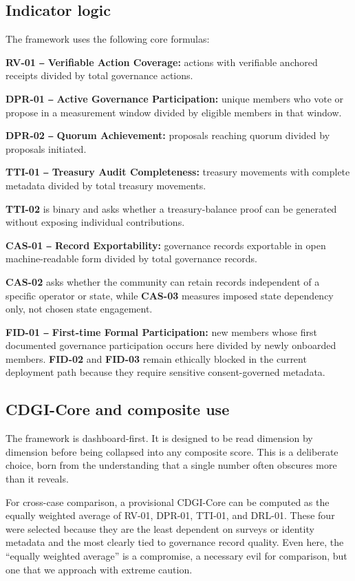 \documentclass[sigconf]{acmart}
\begin{document}
\subsection{Indicator logic}

The framework uses the following core formulas:

\textbf{RV-01 ‒ Verifiable Action Coverage:} actions with verifiable anchored receipts divided by total governance actions.

\textbf{DPR-01 ‒ Active Governance Participation:} unique members who vote or propose in a measurement window divided by eligible members in that window.

\textbf{DPR-02 ‒ Quorum Achievement:} proposals reaching quorum divided by proposals initiated.

\textbf{TTI-01 ‒ Treasury Audit Completeness:} treasury movements with complete metadata divided by total treasury movements.

\textbf{TTI-02} is binary and asks whether a treasury-balance proof can be generated without exposing individual contributions.

\textbf{CAS-01 ‒ Record Exportability:} governance records exportable in open machine-readable form divided by total governance records.

\textbf{CAS-02} asks whether the community can retain records independent of a specific operator or state, while \textbf{CAS-03} measures imposed state dependency only, not chosen state engagement.

\textbf{FID-01 ‒ First-time Formal Participation:} new members whose first documented governance participation occurs here divided by newly onboarded members. \textbf{FID-02} and \textbf{FID-03} remain ethically blocked in the current deployment path because they require sensitive consent-governed metadata.

\subsection{CDGI-Core and composite use}

The framework is dashboard-first. It is designed to be read dimension by dimension before being collapsed into any composite score. This is a deliberate choice, born from the understanding that a single number often obscures more than it reveals.

For cross-case comparison, a provisional CDGI-Core can be computed as the equally weighted average of RV-01, DPR-01, TTI-01, and DRL-01. These four were selected because they are the least dependent on surveys or identity metadata and the most clearly tied to governance record quality. Even here, the “equally weighted average” is a compromise, a necessary evil for comparison, but one that we approach with extreme caution.
\end{document}
